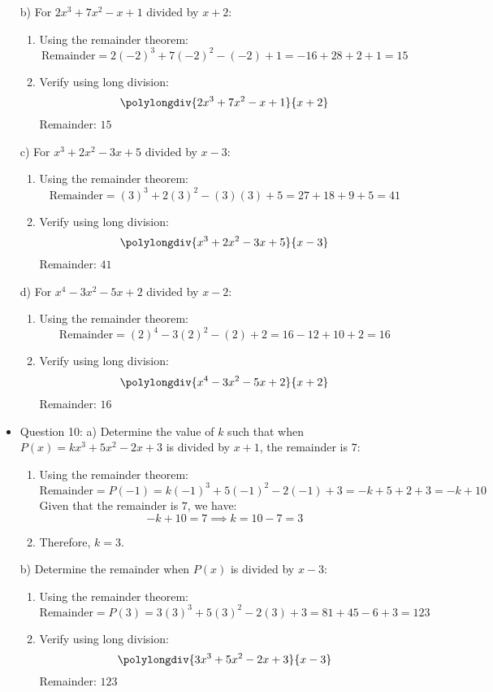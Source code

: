 \documentclass{article}
\begin{document}
\begin{itemize}
b) For \(2x^3 + 7x^2 - x + 1\) divided by \(x + 2\):
\begin{enumerate}
    \item Using the remainder theorem:
    \[
    \text{Remainder} = 2(-2)^3 + 7(-2)^2 - (-2) + 1 = -16 + 28 + 2 + 1 = 15
    \]
    \item Verify using long division:
    \[
    \polylongdiv{2x^3 + 7x^2 - x + 1}{x + 2}
    \]
    Remainder: \(15\)
\end{enumerate}


c) For \(x^3 + 2x^2 - 3x + 5\) divided by \(x - 3\):
\begin{enumerate}
    \item Using the remainder theorem:
    \[
    \text{Remainder} = (3)^3 + 2(3)^2 - (3)(3) + 5 = 27 + 18 + 9 + 5 = 41
    \]
    \item Verify using long division:
    \[
    \polylongdiv{x^3 + 2x^2 - 3x + 5}{x - 3}
    \]
    Remainder: \(41\)
\end{enumerate}

d) For \(x^4 - 3x^2 - 5x + 2\) divided by \(x - 2\):
\begin{enumerate}
    \item Using the remainder theorem:
    \[
    \text{Remainder} = (2)^4 - 3(2)^2 - (2) + 2 = 16 - 12 + 10 + 2 = 16
    \]
    \item Verify using long division:
    \[
    \polylongdiv{x^4 - 3x^2 - 5x + 2}{x + 2}
    \]
    Remainder: \(16\)
\end{enumerate}
\item Question 10:
a) Determine the value of \(k\) such that when \(P(x) = kx^3 + 5x^2 - 2x + 3\) is divided by \(x + 1\), the remainder is \(7\):

\begin{enumerate}
    \item Using the remainder theorem:
    \[
    \text{Remainder} = P(-1) = k(-1)^3 + 5(-1)^2 - 2(-1) + 3 = -k + 5 + 2 + 3 = -k + 10
    \]
    Given that the remainder is \(7\), we have:
    \[
    -k + 10 = 7 \implies k = 10 - 7 = 3
    \]
    \item Therefore, \(k = 3\).
\end{enumerate}

b) Determine the remainder when \(P(x)\) is divided by \(x - 3\):

\begin{enumerate}
    \item Using the remainder theorem:
    \[
    \text{Remainder} = P(3) = 3(3)^3 + 5(3)^2 - 2(3) + 3 = 81 + 45 - 6 + 3 = 123
    \]
    \item Verify using long division:
    \[
    \polylongdiv{3x^3 + 5x^2 - 2x + 3}{x - 3}
    \]
    Remainder: \(123\)
\end{enumerate}



\end{itemize}
\end{document}

